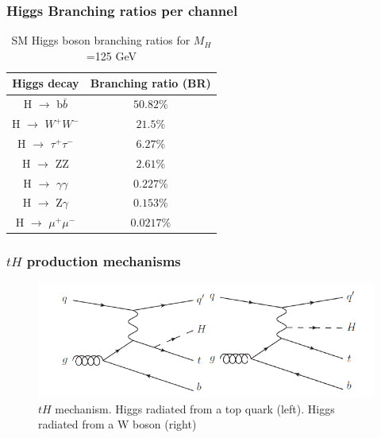 \documentclass[11pt]{beamer}
\newcommand{\nologo}{\setbeamertemplate{logo}{}}
\begin{document}
\begin{frame}
\frametitle{Higgs Branching ratios per channel}
\begin{table}
	\caption*{SM Higgs boson branching ratios for  $M_H$ =125 GeV}
\begin{center}
\begin{tabular}{|c|c|}
	\hline
	Higgs decay & Branching ratio (BR)\\
	\hline
	H $\rightarrow$ b$\bar{b}$ &
	$50.82\%$ \\
	\hline
	H $\rightarrow$ $W^+W^-$ &
	$21.5\%$ \\
	\hline
	H $\rightarrow$ $\tau^+ \tau^-$ &
	$6.27\%$\\
\hline
	H $\rightarrow$ ZZ &
$2.61\%$\\
\hline
	H $\rightarrow$ $\gamma\gamma$ &
$0.227\%$\\
\hline
	H $\rightarrow$ Z$\gamma$ &
$0.153\%$\\
\hline
	H $\rightarrow$ $\mu^+\mu^-$ &
$0.0217\%$\\
\hline
\end{tabular}
\end{center}
\end{table}

\end{frame}

{\nologo
\begin{frame}
\frametitle{$tH$ production mechanisms}
\begin{center}
\begin{figure} 
\includegraphics[scale=0.4]{figures/tq.png} 
\caption*{$tH$ mechanism. Higgs radiated from a top quark (left). Higgs radiated from a W boson (right)} 
\label{th}
\end{figure}
\end{center}
\end{frame} 
}
\end{document}
